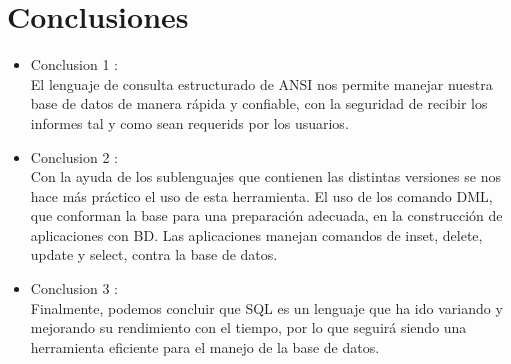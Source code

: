 \documentclass[preprint,12pt]{elsarticle}
\begin{document}

\section{Conclusiones}
\begin{itemize}
\item Conclusion 1 : \\ El lenguaje de consulta estructurado de ANSI nos permite manejar nuestra base de datos de manera rápida y confiable, con la seguridad de recibir los informes tal y como sean requerids por los usuarios.

\item Conclusion 2 : \\ Con la ayuda de los sublenguajes que contienen las distintas versiones se nos hace más práctico el uso de esta herramienta. El uso de los comando DML, que conforman la base para una preparación adecuada, en la construcción de aplicaciones con BD. Las aplicaciones manejan comandos de inset, delete, update y select, contra la base de datos.

\item Conclusion 3 : \\ Finalmente, podemos concluir que SQL es un lenguaje que ha ido variando y mejorando su rendimiento con el tiempo, por lo que seguirá siendo una herramienta eficiente para el manejo de la base de datos.



\end{itemize}
	
	

	\newpage
	
		 
	

	
	
	
	
\end{document}
